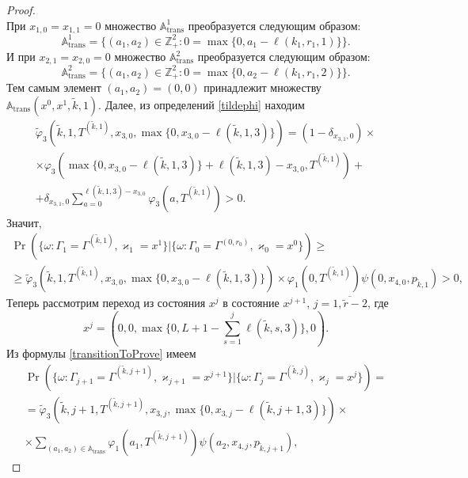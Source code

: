 \begin{proof}
$$$$
При $x_{1,  0} = x_{1,  1} = 0$ множество ${\mathbb A}_{\mathrm{trans}}^1$ преобразуется следующим образом:
$$
{\mathbb A}_{\mathrm{trans}}^1 = \{(a_1,  a_2) \in \mathbb{Z}_+^2 \colon 0=\max{\{0,  a_1-\ell(k_1,  r_1,  1)\}}\}.
$$
И при $x_{2,  1}=x_{2,  0} = 0$ множество $ {\mathbb A}_{\mathrm{trans}}^2 $ преобразуется следующим образом:
$$
{\mathbb A}_{\mathrm{trans}}^2 = \{(a_1,  a_2) \in \mathbb{Z}_+^2 \colon  0 =\max{\{0,  a_2-\ell(k_1,  r_1,  2)\}}\}.
$$
Тем самым элемент $(a_1,  a_2) = (0,  0)$ принадлежит множеству ${\mathbb A}_{\mathrm{trans}}(x^0,  x^1,  \tilde{k},  1)$. Далее,  из определений \eqref{tildephi} находим
\begin{multline*}
\widetilde{\varphi}_3(\tilde{k},  1,  T^{(\tilde{k},  1)},  x_{3,  0}, \max{\{0,  x_{3,  0} - \ell(\tilde{k},  1,  3)\}})= (1-\delta_{x_{3,  1}, 0}) \times \\\times\varphi_3(\max{\{0,  x_{3,  0} - \ell(\tilde{k},  1,  3)\}} + \ell (\tilde{k},  1,  3) - x_{3,  0},  T^{(\tilde{k},  1)} ) 
+\\+\delta_{x_{3,  1},  0} \sum_{a=0}^{\ell(\tilde{k},  1,  3)-x_{3,  0}} \varphi_3 (a,  T^{(\tilde{k},  1)})>0.
\end{multline*}
Значит, 
\begin{multline*}
\Pr(\{\omega\colon \Gamma_{1}=\Gamma^{(\tilde{k},  1)},  \varkappa_{1}=x^1\}|\{\omega\colon 
\Gamma_{0}=\Gamma^{(0,  r_0)},  \varkappa_{0}=x^0\})\geqslant \\
\geqslant \widetilde{\varphi}_3(\tilde{k}, 1, T^{(\tilde{k},  1)},  x_{3,  0}, \max{\{0,  x_{3,  0} - \ell(\tilde{k},  1,  3)\}})
\times
\varphi_1(0,  T^{(\tilde{k},  1)})  \psi(0,  x_{4,  0},  p_{\tilde{k},  1}) > 0, 
\end{multline*}
Теперь рассмотрим переход из состояния $x^j$ в состояние $x^{j+1}$,  $j=\overline{1,  \tilde{r}-2}$,  где
\begin{equation*}
x^j = (0,  0,  \max{\{0,  L+1-\sum_{s=1}^{j} \ell(\tilde{k},  s,  3)\}},  0).
\end{equation*}
Из формулы \eqref{transitionToProve} имеем
\begin{multline*}
\Pr(\{\omega\colon \Gamma_{j+1}=\Gamma^{(\tilde{k},  j+1)},  \varkappa_{j+1}=x^{j+1}\}|
\{\omega\colon \Gamma_{j}=\Gamma^{(\tilde{k},  j)},  \varkappa_{j}=x^j\})=\\
=\widetilde{\varphi}_3(\tilde{k},  j+1,  T^{(\tilde{k},  j+1)},  x_{3, j},  \max{\{0,  x_{3,  j} - \ell(\tilde{k},  j+1,  3)\}})\times \\
\times
\sum_{(a_1,  a_2)\in {\mathbb A}_{\mathrm{trans}}}\varphi_1(a_1,  T^{(\tilde{k},  j+1)})  \psi(a_2,  x_{4,  j},  p_{\tilde{k},  j+1}), 

\end{multline*}
\end{proof}
